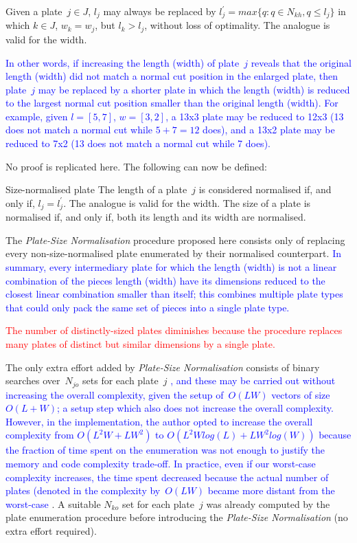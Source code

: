 \documentclass[ppgc,tese,english,formais,babel]{iiufrgs}
\newif\iffinalversion
\newcommand{\newtext}[1]{\iffinalversion%
#1%
\else%
\textcolor{blue}{#1}%
\fi%
}
\newcommand{\oldtext}[1]{\iffinalversion%
\else%
\textcolor{red}{#1}%
\fi%
}
\begin{document}
\begin{proposition}
\label{pro:normalisation}
Given a plate~\(j \in J\), \(l_j\) may always be replaced by \(l^\prime_j = max\{q : q \in N_{kh}, q \leq l_j\}\) in which \(k \in J\), \(w_k = w_j\), but \(l_k > l_j\), without loss of optimality.
The analogue is valid for the width.
\end{proposition}

\newtext{In other words, if increasing the length (width) of plate~\(j\) reveals that the original length (width) did not match a normal cut position in the enlarged plate, then plate~\(j\) may be replaced by a shorter plate in which the length (width) is reduced to the largest normal cut position smaller than the original length (width). For example, given \(l = [5, 7]\), \(w = [3, 2]\), a 13x3 plate may be reduced to 12x3 (13 does not match a normal cut while \(5 + 7 = 12\) does), and a 13x2 plate may be reduced to 7x2 (13 does not match a normal cut while 7 does).}
No proof is replicated here. The following can now be defined:

\begin{definition}{Size-normalised plate}
The length of a plate~\(j\) is considered normalised if, and only if, \(l_j = l^\prime_j\).
The analogue is valid for the width.
The size of a plate is normalised if, and only if, both its length and its width are normalised.
\end{definition}

The \emph{Plate-Size Normalisation} procedure proposed here consists only of replacing every non-size-normalised plate enumerated by their normalised counterpart.
\newtext{In summary, every intermediary plate for which the length (width) is not a linear combination of the pieces length (width) have its dimensions reduced to the closest linear combination smaller than itself; this combines multiple plate types that could only pack the same set of pieces into a single plate type.}
\oldtext{The number of distinctly-sized plates diminishes because the procedure replaces many plates of distinct but similar dimensions by a single plate.}
The only extra effort added by \emph{Plate-Size Normalisation} consists of binary searches over~\(N_{jo}\) sets for each plate~\(j\)\newtext{, and these may be carried out without increasing the overall complexity, given the setup of~\(O(LW)\) vectors of size \(O(L + W)\); a setup step which also does not increase the overall complexity. However, in the implementation, the author opted to increase the overall complexity from \(O(L^2W + LW^2)\) to \(O(L^2Wlog(L) + LW^2log(W))\) because the fraction of time spent on the enumeration was not enough to justify the memory and code complexity trade-off. In practice, even if our worst-case complexity increases, the time spent decreased because the actual number of plates (denoted in the complexity by~\(O(LW)\) became more distant from the worst-case}.
A suitable \(N_{ko}\) set for each plate~\(j\) was already computed by the plate enumeration procedure before introducing the \emph{Plate-Size Normalisation} (no extra effort required).
\end{document}
